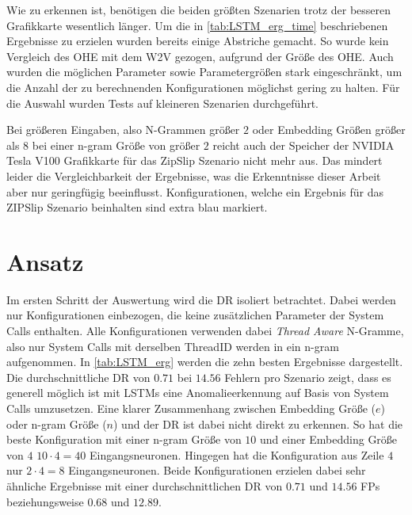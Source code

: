     Wie zu erkennen ist, benötigen die beiden größten Szenarien trotz der besseren Grafikkarte wesentlich länger.
    Um die in \autoref{tab:LSTM_erg_time} beschriebenen Ergebnisse zu erzielen wurden bereits einige Abstriche gemacht.
    So wurde kein Vergleich des \ac{OHE} mit dem \ac{W2V} gezogen, aufgrund der Größe des \ac{OHE}.
    Auch wurden die möglichen Parameter sowie Parametergrößen stark eingeschränkt, um die Anzahl der zu berechnenden Konfigurationen möglichst gering zu halten.
    Für die Auswahl wurden Tests auf kleineren Szenarien durchgeführt.
    
    Bei größeren Eingaben, also N-Grammen größer $2$ oder Embedding Größen größer als $8$ bei einer n-gram Größe von größer $2$ reicht auch der Speicher der NVIDIA Tesla V100 Grafikkarte für das ZipSlip Szenario nicht mehr aus.
    Das mindert leider die Vergleichbarkeit der Ergebnisse, was die Erkenntnisse dieser Arbeit aber nur geringfügig beeinflusst.
    Konfigurationen, welche ein Ergebnis für das ZIPSlip Szenario beinhalten sind extra blau markiert.

    \section{ Ansatz}\label{sec:erg_LSTM}

    Im ersten Schritt der Auswertung wird die \ac{DR} isoliert betrachtet.
    Dabei werden nur Konfigurationen einbezogen, die keine zusätzlichen Parameter der System Calls enthalten.
    Alle Konfigurationen verwenden dabei \textit{Thread Aware} N-Gramme, also nur System Calls mit derselben ThreadID werden in ein n-gram aufgenommen.
    In \autoref{tab:LSTM_erg} werden die zehn besten Ergebnisse dargestellt.
    Die durchschnittliche \ac{DR} von $0.71$ bei $14.56$ Fehlern pro Szenario zeigt, dass es generell möglich ist mit \acp{LSTM} eine Anomalieerkennung auf Basis von System Calls umzusetzen.
    Eine klarer Zusammenhang zwischen Embedding Größe ($e$) oder n-gram Größe ($n$) und der \ac{DR} ist dabei nicht direkt zu erkennen.
    So hat die beste Konfiguration mit einer n-gram Größe von $10$ und einer Embedding Größe von $4$ $10 \cdot 4=40$ Eingangsneuronen.
    Hingegen hat die Konfiguration aus Zeile $4$ nur $2 \cdot 4 = 8$ Eingangsneuronen.
    Beide Konfigurationen erzielen dabei sehr ähnliche Ergebnisse mit einer durchschnittlichen \ac{DR} von $0.71$ und $14.56$ \acp{FP} beziehungsweise $0.68$ und $12.89$.

